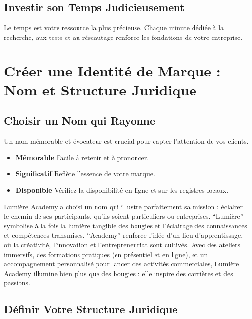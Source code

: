 \documentclass[11pt,fleqn,onecolumn,oneside]{book}
\begin{document}
\subsection*{Investir son Temps Judicieusement}

\begin{corollary}
Le temps est votre ressource la plus précieuse. Chaque minute dédiée à la recherche, aux tests et au réseautage renforce les fondations de votre entreprise.
\end{corollary}

\section{Créer une Identité de Marque : Nom et Structure Juridique}

\subsection*{Choisir un Nom qui Rayonne}

Un nom mémorable et évocateur est crucial pour capter l’attention de vos clients.

\begin{itemize}
    \item \textbf{Mémorable} Facile à retenir et à prononcer.
    \item \textbf{Significatif} Reflète l’essence de votre marque.
    \item \textbf{Disponible} Vérifiez la disponibilité en ligne et sur les registres locaux.
\end{itemize}

\begin{exampleT}
Lumière Academy a choisi un nom qui illustre parfaitement sa mission : éclairer le chemin de ses participants, qu’ils soient particuliers ou entreprises. ``Lumière'' symbolise à la fois la lumière tangible des bougies et l’éclairage des connaissances et compétences transmises. ``Academy'' renforce l’idée d’un lieu d’apprentissage, où la créativité, l’innovation et l’entrepreneuriat sont cultivés. Avec des ateliers immersifs, des formations pratiques (en présentiel et en ligne), et un accompagnement personnalisé pour lancer des activités commerciales, Lumière Academy illumine bien plus que des bougies : elle inspire des carrières et des passions.
\end{exampleT}


\subsection*{Définir Votre Structure Juridique}
\end{document}
